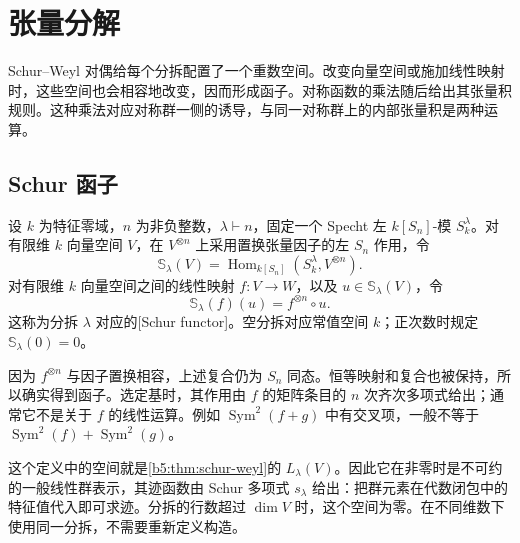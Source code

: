 \section{张量分解}
\label{b5:sec:0704}

Schur--Weyl 对偶给每个分拆配置了一个重数空间。改变向量空间或施加线性映射时，这些空间也会相容地改变，因而形成函子。对称函数的乘法随后给出其张量积规则。这种乘法对应对称群一侧的诱导，与同一对称群上的内部张量积是两种运算。

\subsection{Schur 函子}
\label{b5:subsec:0704:01}

\begin{definition}\label{b5:def:schur-functor}
	设 \(k\) 为特征零域，\(n\) 为非负整数，\(\lambda\vdash n\)，固定一个 Specht 左 \(k[S_n]\)-模 \(S^\lambda_k\)。对有限维 \(k\) 向量空间 \(V\)，在 \(V^{\otimes n}\) 上采用置换张量因子的左 \(S_n\) 作用，令
	\[
		\mathbb S_\lambda(V) =\operatorname{Hom}_{k[S_n]}(S^\lambda_k,V^{\otimes n}).
	\]
	对有限维 \(k\) 向量空间之间的线性映射 \(f:V\to W\)，以及 \(u\in\mathbb S_\lambda(V)\)，令
	\[
		\mathbb S_\lambda(f)(u)=f^{\otimes n}\circ u.
	\]
	这称为分拆 \(\lambda\) 对应的[Schur functor]。空分拆对应常值空间 \(k\)；正次数时规定 \(\mathbb S_\lambda(0)=0\)。
\end{definition}

因为 \(f^{\otimes n}\) 与因子置换相容，上述复合仍为 \(S_n\) 同态。恒等映射和复合也被保持，所以确实得到函子。选定基时，其作用由 \(f\) 的矩阵条目的 \(n\) 次齐次多项式给出；通常它不是关于 \(f\) 的线性运算。例如 \(\operatorname{Sym}^2(f+g)\) 中有交叉项，一般不等于 \(\operatorname{Sym}^2(f)+\operatorname{Sym}^2(g)\)。

\ProseParagraphBreak
这个定义中的空间就是\cref{b5:thm:schur-weyl}的 \(L_\lambda(V)\)。因此它在非零时是不可约的一般线性群表示，其迹函数由 Schur 多项式 \(s_\lambda\) 给出：把群元素在代数闭包中的特征值代入即可求迹。分拆的行数超过 \(\dim V\) 时，这个空间为零。在不同维数下使用同一分拆，不需要重新定义构造。

